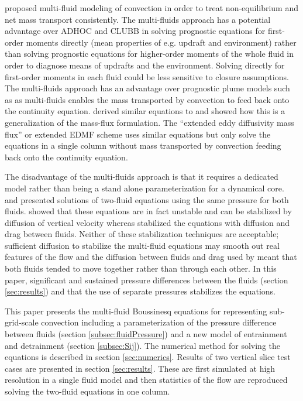 \documentclass[draft]{agujournal2019}
\begin{document}
 proposed multi-fluid modeling of convection in order
to treat non-equilibrium and net mass transport  consistently.
The multi-fluids approach has a potential advantage over ADHOC and CLUBB in solving prognostic equations for first-order moments directly (mean properties of e.g. updraft and environment) rather than solving prognostic equations for higher-order moments of the whole fluid in order to diagnose means of updrafts and the environment. Solving directly for first-order moments in each fluid could be less sensitive to closure assumptions.
The multi-fluids approach has an advantage over prognostic plume models such as \protect{} as multi-fluids enables the mass transported by convection to feed back onto the continuity equation.  derived similar
equations to   and showed how this is a generalization
of the mass-flux formulation. The  ``extended eddy
diffusivity mass flux'' or extended EDMF scheme  uses similar
equations but 
only solve the equations in a single column without
{mass transported by convection feeding back onto the continuity equation.}

The disadvantage of the multi-fluids approach is that it requires
a dedicated model rather than being a stand alone parameterization
for a dynamical core.  and  presented solutions
of two-fluid equations using the same pressure for both fluids.
 showed that these equations  are in fact unstable and can be stabilized by diffusion of vertical
velocity whereas  stabilized the equations with diffusion
and drag between fluids. Neither of these stabilization techniques
are acceptable;
sufficient diffusion to stabilize the multi-fluid equations may smooth out real features of the flow and the diffusion between fluids and drag used by \protect{} meant that both fluids tended to move together rather than through each other.
In this paper,  significant
and sustained pressure differences between the fluids   (section \ref{sec:results}) and that the use of separate pressures stabilizes the equations. 

This paper presents the multi-fluid Boussinesq equations for representing
sub-grid-scale convection including a parameterization of the pressure
difference between fluids (section \ref{subsec:fluidPressure}) and
a new model of entrainment and detrainment (section \ref{subsec:Sij}).
The numerical method for solving the equations is described in section
\ref{sec:numerics}. Results of two vertical slice test cases are presented in section {\protect\ref{sec:results}}. These are first simulated at high resolution in a single fluid model and then statistics of the flow are reproduced solving the two-fluid equations in one column.
\end{document}
